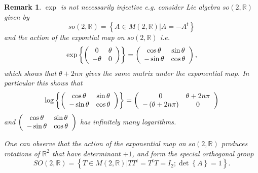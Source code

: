 \documentclass[aps,preprint]{revtex4}%
\newtheorem{remark}[theorem]{Remark}
\begin{document}
\begin{remark}
$\exp$ is \emph{not necessarily injective} e.g. consider Lie algebra
$so\left(  2,\mathbb{R}\right)  $ given by
\begin{equation}
so\left(  2,\mathbb{R}\right)  =\left\{  \left.  A\in M\left(  2,\mathbb{R}%
\right)  \right\vert A=-A^{t}\right\}
\end{equation}
and the action of the expontial map on $so\left(  2,\mathbb{R}\right)  $ i.e.
\begin{equation}
\exp\left\{  \left(
\begin{array}
[c]{cc}%
0 & \theta\\
-\theta & 0
\end{array}
\right)  \right\}  =\left(
\begin{array}
[c]{cc}%
\cos\theta & \sin\theta\\
-\sin\theta & \cos\theta
\end{array}
\right)  ,
\end{equation}
which shows that $\theta+2n\pi$ gives the same matrix under the exponential
map. In particular this shows that
\begin{equation}
\log\left\{  \left(
\begin{array}
[c]{cc}%
\cos\theta & \sin\theta\\
-\sin\theta & \cos\theta
\end{array}
\right)  \right\}  =\left(
\begin{array}
[c]{cc}%
0 & \theta+2n\pi\\
-\left(  \theta+2n\pi\right)  & 0
\end{array}
\right)
\end{equation}
and $\left(
\begin{array}
[c]{cc}%
\cos\theta & \sin\theta\\
-\sin\theta & \cos\theta
\end{array}
\right)  $ has infinitely many logarithms.

One can observe that the action of the exponential map on $so\left(
2,\mathbb{R}\right)  $ produces rotations of $\mathbb{R}^{2}$ that have
determinant $+1$, and form the special orthogonal group
\begin{equation}
SO\left(  2,\mathbb{R}\right)  =\left\{  \left.  T\in M\left(  2,\mathbb{R}%
\right)  \right\vert TT^{t}=T^{t}T=I_{2};\det\left\{  A\right\}  =1\right\}  .
\end{equation}

\end{remark}
\end{document}
